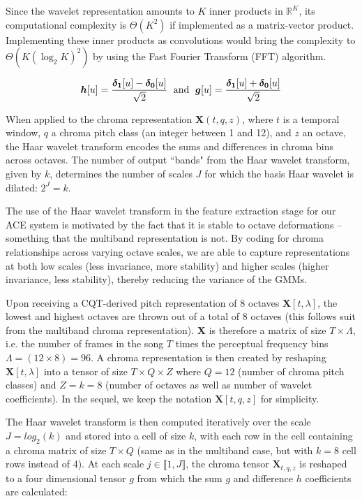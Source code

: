 \documentclass{article}
\makeatletter
\newcommand*{\ie}{i.e.\@\xspace}
\makeatother
\begin{document}
Since the wavelet representation amounts to $K$ inner products in $\mathbb{R}^K$, its computational complexity is $\Theta(K^2)$ if implemented as a matrix-vector product.
Implementing these inner products as convolutions would bring the complexity to $\Theta{(K (\log_2 K)^2)}$ by using the Fast Fourier Transform (FFT) algorithm.

\begin{equation}
\boldsymbol{h}[u] = \frac{\boldsymbol{\delta_1}[u] - \boldsymbol{\delta_0}[u]}{\sqrt{2}}
\mbox{\; and \;}
\boldsymbol{g}[u] = \frac{\boldsymbol{\delta_1}[u] + \boldsymbol{\delta_0}[u]}{\sqrt{2}}
\end{equation}

When applied to the chroma representation $\boldsymbol{X}(t,q,z)$, where $t$ is a temporal window, $q$ a chroma pitch class (an integer between 1 and 12), and $z$ an octave, the Haar wavelet transform encodes the sums and differences in chroma bins across octaves.
The number of output ``bands" from the Haar wavelet transform, given by $k$, determines the number of scales $J$ for which the basis Haar wavelet is dilated: $2^J = k$.

The use of the Haar wavelet transform in the feature extraction stage for our ACE system is motivated by the fact that it is stable to octave deformations -- something that the multiband representation is not. By coding for chroma relationships across varying octave scales, we are able to capture representations at both low scales (less invariance, more stability) and higher scales (higher invariance, less stability), thereby reducing the variance of the GMMs. 
	
	Upon receiving a CQT-derived pitch representation of 8 octaves $\boldsymbol{X}[t,\lambda]$, the lowest and highest octaves are thrown out of a total of 8 octaves (this follows suit from the multiband chroma representation).
$\boldsymbol{X}$ is therefore a matrix of size $T \times \Lambda$, \ie the number of frames in the song $T$ times the perceptual frequency bins $\Lambda = (12 \times 8) = 96$.
A chroma representation is then created by reshaping $\boldsymbol{X}[t, \lambda]$ into a tensor of size $T \times Q \times Z$ where $Q = 12$ (number of chroma pitch classes) and $Z = k = 8$ (number of octaves as well as number of wavelet coefficients).
In the sequel, we keep the notation $\boldsymbol{X}[t, q, z]$ for simplicity.
	
	The Haar wavelet transform is then computed iteratively over the scale $J  = log_2(k)$ and stored into a cell of size $k$, with each row in the cell containing a chroma matrix of size $T \times Q$ (same as in the multiband case, but with $k=8$ cell rows instead of 4). At each scale $j \in \llbracket1, J\rrbracket$, the chroma tensor $\boldsymbol{X}_{t,q,z}$ is reshaped to a four dimensional tensor $g$ from which the sum $g$ and difference $h$ coefficients are calculated:
	
\end{document}
